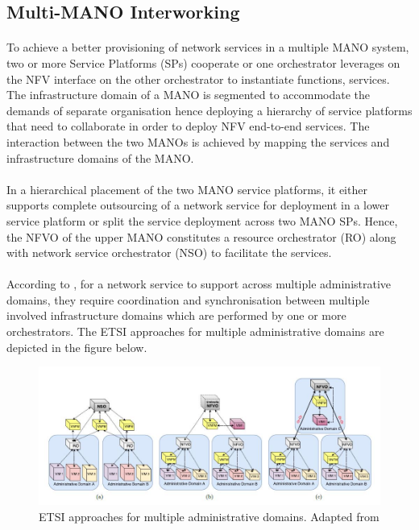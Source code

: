 \subsection{Multi-MANO Interworking}
\paragraph{}To achieve a better provisioning of network services in a multiple MANO system, two or more Service Platforms (SPs) cooperate or one orchestrator leverages on the NFV interface on the other orchestrator to instantiate functions, services. The infrastructure domain of a MANO is segmented to accommodate the demands of separate organisation hence deploying a hierarchy of service platforms that need to collaborate in order to deploy NFV end-to-end services. The interaction between the two MANOs is achieved by mapping the services and infrastructure domains of the MANO. 

\paragraph{}In a hierarchical placement of the two MANO service platforms, it either supports complete outsourcing of a network service for deployment in a lower service platform or split the service deployment across two MANO SPs. Hence, the NFVO of the upper MANO constitutes a resource orchestrator (RO) along with network service orchestrator (NSO) to facilitate the services.



\paragraph{}According to \cite{de2018network}, for a network service to support across multiple administrative domains, they require coordination and synchronisation between multiple involved infrastructure domains which are performed by one or more orchestrators. The ETSI approaches for multiple administrative domains are depicted in the figure below.

\begin{figure} [H]
	\centering
	\includegraphics[width=0.8\linewidth]{"figures/ETSI approaches"}
	\caption{ETSI approaches for multiple administrative domains. Adapted from \cite{de2018network}}
	\label{fig:etsi-approaches}
\end{figure}


